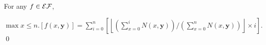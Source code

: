 
\begin{pf} \rm For any $f \in \mathcal{EF}$,

\noindent
$\displaystyle \max x \leq n.[f(x,\mathbf{y})]
= \sum_{i=0}^{n} \left[ \left\lfloor
  \left( \sum_{x=0}^{i} N(x, \mathbf{y}) \right)
   /
  \left( \sum_{x=0}^{n} N(x, \mathbf{y}) \right) \right\rfloor
  \times i
\right].
$ \qed
\end{pf}
